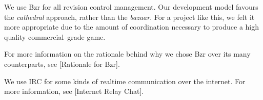 

\startitemize[4]

We use Bzr for all revision control management. Our development model favours the {\it cathedral} approach, rather than the {\it bazaar}. For a project like this, we felt it more appropriate due to the amount of coordination necessary to produce a high quality commercial--grade game. 

For more information on the rationale behind why we chose Bzr over its many counterparts, see [Rationale for Bzr].


We use IRC for some kinds of realtime communication over the internet. For more information, see [Internet Relay Chat].
\stopitemize

